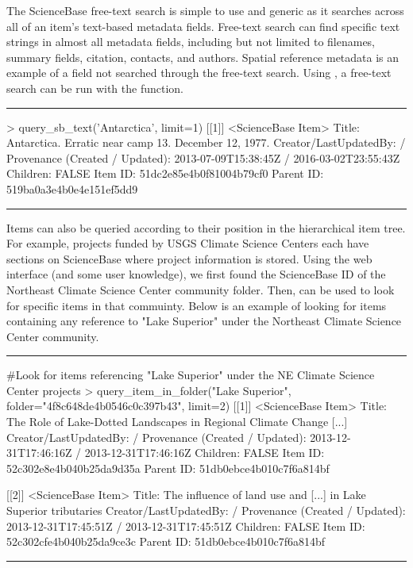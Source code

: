 The ScienceBase free-text search is simple to use and generic as it 
searches across all of an item's text-based metadata fields. Free-text 
search can find specific text strings in almost all metadata fields, including 
but not limited to filenames, summary fields, citation, contacts, and authors. 
Spatial reference metadata is an example of a field not searched through the 
free-text search. Using , a free-text 
search can be run with the  function.

\noindent\rule{\textwidth}{0.4pt}
\begin{example}
> query_sb_text('Antarctica', limit=1)
[[1]]
<ScienceBase Item> 
  Title: Antarctica. Erratic near camp 13. December 12, 1977.
  Creator/LastUpdatedBy:      / 
  Provenance (Created / Updated):  2013-07-09T15:38:45Z / 2016-03-02T23:55:43Z
  Children: FALSE
  Item ID: 51dc2e85e4b0f81004b79cf0
  Parent ID: 519ba0a3e4b0e4e151ef5dd9
\end{example}
\noindent\rule{\textwidth}{0.4pt}

Items can also be queried according to their position in the hierarchical item
tree. For example, projects funded by USGS Climate Science Centers each have sections on ScienceBase
where project information is stored. Using the web interface (and some user knowledge), we first found the
ScienceBase ID of the Northeast Climate Science Center community folder. Then,  can be used 
to look for specific items in that commuinty. Below is an example of looking for 
items containing any reference to "Lake Superior" under the Northeast Climate Science Center community. 

\noindent\rule{\textwidth}{0.4pt}
\begin{example}
#Look for items referencing "Lake Superior" under the NE Climate Science Center projects
> query_item_in_folder("Lake Superior", folder="4f8c648de4b0546c0c397b43", limit=2)
[[1]]	
<ScienceBase Item> 
  Title: The Role of Lake-Dotted Landscapes in Regional Climate Change [...]
  Creator/LastUpdatedBy:      / 
  Provenance (Created / Updated):  2013-12-31T17:46:16Z / 2013-12-31T17:46:16Z
  Children: FALSE	
  Item ID: 52c302e8e4b040b25da9d35a
  Parent ID: 51db0ebce4b010c7f6a814bf

[[2]]
<ScienceBase Item> 
  Title: The influence of land use and [...] in Lake Superior tributaries
  Creator/LastUpdatedBy:      / 
  Provenance (Created / Updated):  2013-12-31T17:45:51Z / 2013-12-31T17:45:51Z
  Children: FALSE
  Item ID: 52c302cfe4b040b25da9ce3c
  Parent ID: 51db0ebce4b010c7f6a814bf
\end{example}
\noindent\rule{\textwidth}{0.4pt}

